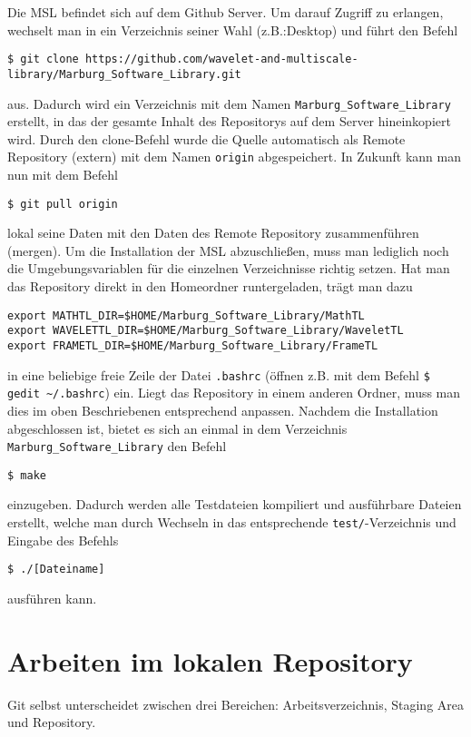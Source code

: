\documentclass[a4paper,11pt,german]{article}
\begin{document}
Die MSL befindet sich auf dem Github Server. Um darauf Zugriff zu erlangen, wechselt man in ein Verzeichnis seiner Wahl (z.B.:Desktop) und führt den Befehl
\begin{verbatim}
$ git clone https://github.com/wavelet-and-multiscale-library/Marburg_Software_Library.git
\end{verbatim}
aus.
Dadurch wird ein Verzeichnis mit dem Namen \verb|Marburg_Software_Library| erstellt, in das der gesamte Inhalt des Repositorys auf dem Server hineinkopiert wird. Durch den clone-Befehl wurde die Quelle automatisch als Remote Repository (extern) mit dem Namen \verb|origin| abgespeichert.
In Zukunft kann man nun mit dem Befehl
\begin{verbatim}
$ git pull origin
\end{verbatim}
lokal seine Daten mit den Daten des Remote Repository zusammenführen (mergen).
Um die Installation der MSL abzuschließen, muss man lediglich noch die Umgebungsvariablen für die einzelnen Verzeichnisse richtig setzen.
Hat man das Repository direkt in den Homeordner runtergeladen, trägt man dazu 
\begin{verbatim}
export MATHTL_DIR=$HOME/Marburg_Software_Library/MathTL
export WAVELETTL_DIR=$HOME/Marburg_Software_Library/WaveletTL
export FRAMETL_DIR=$HOME/Marburg_Software_Library/FrameTL
\end{verbatim}
in eine beliebige freie Zeile der Datei \verb|.bashrc| 
(öffnen z.B. mit dem Befehl \verb|$ gedit ~/.bashrc|) ein. Liegt das Repository in einem anderen Ordner, muss man dies im oben Beschriebenen 
entsprechend anpassen. Nachdem die Installation abgeschlossen ist, bietet es sich an einmal in dem Verzeichnis \verb|Marburg_Software_Library|
den Befehl
\begin{verbatim}
$ make
\end{verbatim}
einzugeben. Dadurch werden alle Testdateien kompiliert und ausführbare Dateien erstellt, welche man durch Wechseln in das
entsprechende \verb|test/|-Verzeichnis und Eingabe des Befehls
\begin{verbatim}
$ ./[Dateiname]
\end{verbatim}
ausführen kann.


\section{Arbeiten im lokalen Repository}

Git selbst unterscheidet zwischen drei Bereichen: Arbeitsverzeichnis, Staging Area und Repository.
\end{document}
